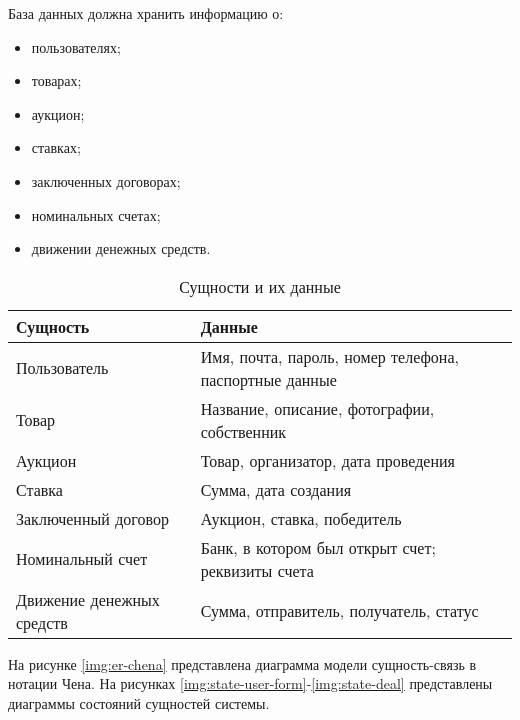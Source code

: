 База данных должна хранить информацию о:
\begin{itemize}
    \item пользователях;
    \item товарах;
    \item аукцион;
    \item ставках;
    \item заключенных договорах;
    \item номинальных счетах;
    \item движении денежных средств.
\end{itemize}

\begin{table}[thp]
    \centering
    \caption{Сущности и их данные}
    \label{tab:data}
    \begin{tabular}{|p{7cm}|p{7cm}|}
         \hline
         \textbf{Сущность} & \textbf{Данные} \\
         \hline
         Пользователь & Имя, почта, пароль, номер телефона, паспортные данные\\
          \hline
         Товар & Название, описание, фотографии, собственник \\
          \hline
         Аукцион & Товар, организатор, дата проведения \\
         \hline
         Ставка & Сумма, дата создания \\
         \hline
         Заключенный договор & Аукцион, ставка, победитель \\
         \hline
         Номинальный счет & Банк, в котором был открыт счет; реквизиты счета \\
         \hline
         Движение денежных средств & Сумма, отправитель, получатель, статус \\
         \hline
    \end{tabular}
\end{table}

На рисунке \ref{img:er-chena} представлена диаграмма модели сущность-связь в нотации Чена. На рисунках \ref{img:state-user-form}-\ref{img:state-deal} представлены диаграммы состояний сущностей системы.


\newpage




